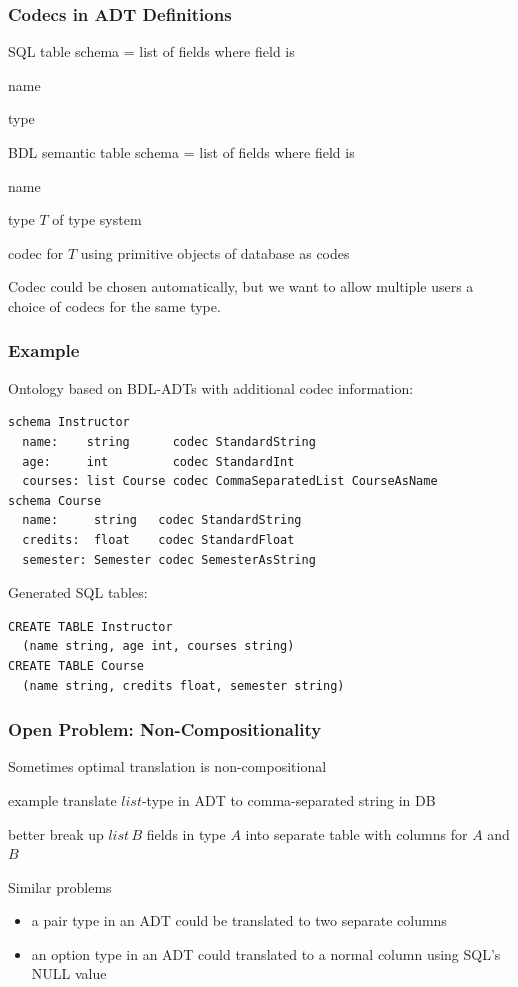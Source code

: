 \documentclass{beamer}
\renewcommand{\emph}[1]{\alert{#1}}
\begin{document}
\begin{frame}\frametitle{Codecs in ADT Definitions}
\begin{blockitems}{SQL table schema = list of fields where field is}
\item name
\item type 
\end{blockitems}

\begin{blockitems}{BDL semantic table schema = list of fields where field is}
\item name
\item type $T$ of \emph{type system} 
\item codec for $T$ using primitive objects of database as codes
\end{blockitems}

Codec could be chosen automatically, but we want to allow multiple users a choice of codecs for the same type.
\end{frame}

\begin{frame}[fragile]\frametitle{Example}
Ontology based on BDL-ADTs with additional codec information:
\begin{lstlisting}[basicstyle=\footnotesize]
schema Instructor
  name:    string      codec StandardString
  age:     int         codec StandardInt
  courses: list Course codec CommaSeparatedList CourseAsName
schema Course
  name:     string   codec StandardString
  credits:  float    codec StandardFloat
  semester: Semester codec SemesterAsString
\end{lstlisting}
\medskip

Generated SQL tables:
\begin{lstlisting}[basicstyle=\footnotesize]
CREATE TABLE Instructor
  (name string, age int, courses string)
CREATE TABLE Course
  (name string, credits float, semester string)
\end{lstlisting}
\end{frame}

\begin{frame}\frametitle{Open Problem: Non-Compositionality}
\begin{blockitems}{Sometimes optimal translation is non-compositional}
\item example translate $list$-type in ADT to comma-separated string in DB
\item better break up $list\,B$ fields in type $A$ into separate table with columns for $A$ and $B$
\end{blockitems}

Similar problems
\begin{itemize}
\item a pair type in an ADT could be translated to two separate columns
\item an option type in an ADT could translated to a normal column using SQL's NULL value
\end{itemize}
\end{frame}
\end{document}
